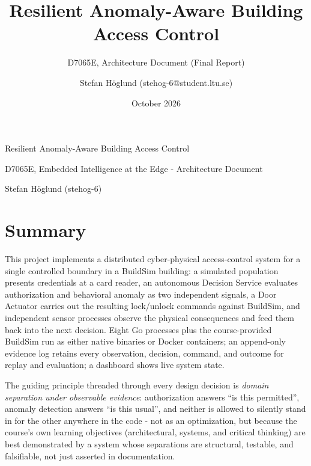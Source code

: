 \documentclass[11pt]{article}
\title{Resilient Anomaly-Aware Building Access Control}
\subtitle{D7065E, Architecture Document (Final Report)}
\author{Stefan Höglund (stehog-6@student.ltu.se)}
\date{October 2026}
\begin{document}
\begin{center}
{\LARGE Resilient Anomaly-Aware Building Access Control\par}
\vspace{0.5em}
{\large D7065E, Embedded Intelligence at the Edge - Architecture Document\par}
\vspace{1em}
{Stefan Höglund (stehog-6)\par}
\end{center}

\vspace{1.2em}

{
\hypersetup{linkcolor=black}
\setcounter{tocdepth}{2}
\tableofcontents
}

\newpage

\section{Summary}
\label{sec:summary}

This project implements a distributed cyber-physical access-control
system for a single controlled boundary in a BuildSim building: a
simulated population presents credentials at a card reader, an
autonomous Decision Service evaluates authorization and behavioral
anomaly as two independent signals, a Door Actuator carries out the
resulting lock/unlock commands against BuildSim, and independent sensor
processes observe the physical consequences and feed them back into the
next decision. Eight Go processes plus the course-provided BuildSim run
as either native binaries or Docker containers; an append-only evidence
log retains every observation, decision, command, and outcome for replay
and evaluation; a dashboard shows live system state.

The guiding principle threaded through every design decision is
\emph{domain separation under observable evidence}: authorization answers
``is this permitted'', anomaly detection answers ``is this usual'', and
neither is allowed to silently stand in for the other anywhere in the
code - not as an optimization, but because the course's own learning
objectives (architectural, systems, and critical thinking) are best
demonstrated by a system whose separations are structural, testable, and
falsifiable, not just asserted in documentation.
\end{document}
